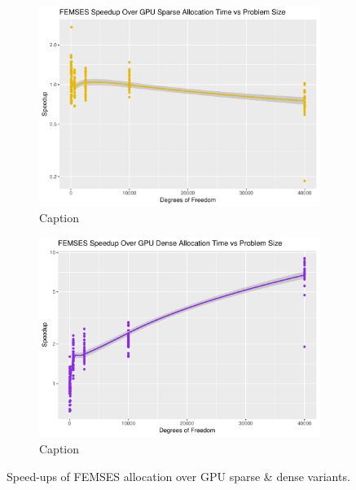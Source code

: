 \begin{figure}
	\centering
	\begin{subfigure}{0.48\linewidth}
		\centering
		\includegraphics[width =\linewidth]{Plots/alloc_femses_sparse_speedup_vs_n}
		\caption{Caption}
		\label{fig:alloc_femses_sparse}
	\end{subfigure}\hfill
	\begin{subfigure}{0.48\linewidth}
		\centering
		\includegraphics[width=\linewidth]{Plots/alloc_femses_dense_speedup_vs_n}
		\caption{Caption}
		\label{fig:alloc_femses_dense}
	\end{subfigure}
	\caption{Speed-ups of FEMSES allocation over GPU sparse \& dense variants.}
	\label{fig:alloc_femses_su}
\end{figure}


